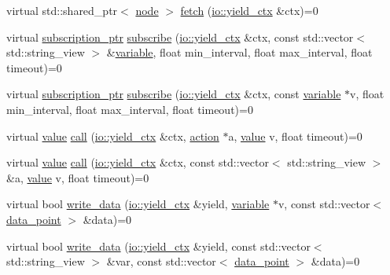\begin{DoxyCompactItemize}
\item 
virtual std\+::shared\+\_\+ptr$<$ \hyperlink{classtelegraph_1_1node}{node} $>$ \hyperlink{classtelegraph_1_1context_aa2c0321629f2d51c8bc5632e418b305f}{fetch} (\hyperlink{structboost_1_1asio_1_1yield__ctx}{io\+::yield\+\_\+ctx} \&ctx)=0
\item 
virtual \hyperlink{namespacetelegraph_a58641aa5b1a2cbdb0431916a87069f64}{subscription\+\_\+ptr} \hyperlink{classtelegraph_1_1context_a8db167973f187f707a4108e112683969}{subscribe} (\hyperlink{structboost_1_1asio_1_1yield__ctx}{io\+::yield\+\_\+ctx} \&ctx, const std\+::vector$<$ std\+::string\+\_\+view $>$ \&\hyperlink{classtelegraph_1_1variable}{variable}, float min\+\_\+interval, float max\+\_\+interval, float timeout)=0
\item 
virtual \hyperlink{namespacetelegraph_a58641aa5b1a2cbdb0431916a87069f64}{subscription\+\_\+ptr} \hyperlink{classtelegraph_1_1context_aec3b3b0d7210a86f2ea2f5067ef8e922}{subscribe} (\hyperlink{structboost_1_1asio_1_1yield__ctx}{io\+::yield\+\_\+ctx} \&ctx, const \hyperlink{classtelegraph_1_1variable}{variable} $\ast$v, float min\+\_\+interval, float max\+\_\+interval, float timeout)=0
\item 
virtual \hyperlink{classtelegraph_1_1value}{value} \hyperlink{classtelegraph_1_1context_a72da471eb635e5505b10d2f1103359ac}{call} (\hyperlink{structboost_1_1asio_1_1yield__ctx}{io\+::yield\+\_\+ctx} \&ctx, \hyperlink{classtelegraph_1_1action}{action} $\ast$a, \hyperlink{classtelegraph_1_1value}{value} v, float timeout)=0
\item 
virtual \hyperlink{classtelegraph_1_1value}{value} \hyperlink{classtelegraph_1_1context_a0798d49ea0874a870d4c980f6f09b6c2}{call} (\hyperlink{structboost_1_1asio_1_1yield__ctx}{io\+::yield\+\_\+ctx} \&ctx, const std\+::vector$<$ std\+::string\+\_\+view $>$ \&a, \hyperlink{classtelegraph_1_1value}{value} v, float timeout)=0
\item 
virtual bool \hyperlink{classtelegraph_1_1context_a6067b9a6f2590733c81f6a3b2ed9cba7}{write\+\_\+data} (\hyperlink{structboost_1_1asio_1_1yield__ctx}{io\+::yield\+\_\+ctx} \&yield, \hyperlink{classtelegraph_1_1variable}{variable} $\ast$v, const std\+::vector$<$ \hyperlink{classtelegraph_1_1data__point}{data\+\_\+point} $>$ \&data)=0
\item 
virtual bool \hyperlink{classtelegraph_1_1context_a1f600d6159df21dd2750b1c706ca3412}{write\+\_\+data} (\hyperlink{structboost_1_1asio_1_1yield__ctx}{io\+::yield\+\_\+ctx} \&yield, const std\+::vector$<$ std\+::string\+\_\+view $>$ \&var, const std\+::vector$<$ \hyperlink{classtelegraph_1_1data__point}{data\+\_\+point} $>$ \&data)=0

\end{DoxyCompactItemize}
